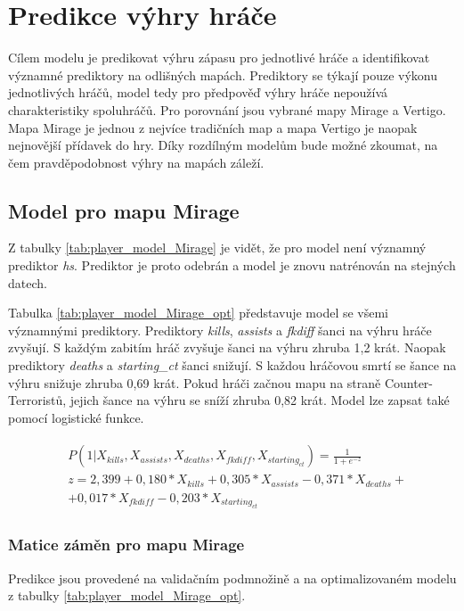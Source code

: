 \section{Predikce výhry hráče}
Cílem modelu je predikovat výhru zápasu pro jednotlivé hráče a identifikovat významné prediktory na odlišných mapách.
Prediktory se týkají pouze výkonu jednotlivých hráčů, model tedy pro předpověď výhry hráče nepoužívá charakteristiky spoluhráčů. Pro porovnání jsou vybrané mapy Mirage a Vertigo.
Mapa Mirage je jednou z nejvíce tradičních map a mapa Vertigo je naopak nejnovější přídavek do hry. Díky rozdílným modelům bude možné zkoumat, na čem pravděpodobnost výhry na 
mapách záleží.

\subsection{Model pro mapu Mirage}



Z tabulky \ref{tab:player_model_Mirage} je vidět, že pro model není významný prediktor \textit{hs}. Prediktor je proto odebrán a model je znovu natrénován na stejných datech.



Tabulka \ref{tab:player_model_Mirage_opt} představuje model se všemi významnými prediktory. Prediktory \textit{kills}, \textit{assists} a \textit{fkdiff} šanci na výhru
hráče zvyšují. S každým zabitím hráč zvyšuje šanci na výhru zhruba 1,2 krát. Naopak prediktory \textit{deaths} a \textit{starting\_ct} šanci snižují. S každou hráčovou smrtí
se šance na výhru snižuje zhruba 0,69 krát. Pokud hráči začnou mapu na straně Counter-Terroristů, jejich šance na výhru se sníží zhruba 0,82 krát. 
Model lze zapsat také pomocí logistické funkce.

\begin{align*}
    \begin{split}
        &P(1 | X_{kills}, X_{assists}, X_{deaths}, X_{fkdiff}, X_{starting_{ct}}) = \frac{1}{1 + e^{-z}} \\
        &z = 2,399 + 0,180*X_{kills} + 0,305*X_{assists} - 0,371*X_{deaths} + \\
        &+ 0,017*X_{fkdiff} - 0,203*X_{starting_{ct}}
    \end{split}
    \label{eq:player_funkce_Mirage}
\end{align*}

\subsubsection{Matice záměn pro mapu Mirage}
Predikce jsou provedené na validačním podmnožině a na optimalizovaném modelu z tabulky \ref{tab:player_model_Mirage_opt}.

